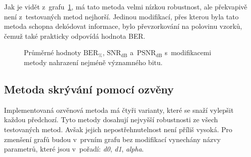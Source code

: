 Jak je vidět z~grafu~\ref{pic:modifications-mean-values-lsb}, má tato metoda
velmi nízkou robustnost, ale překvapivě není z~testovaných metod nejhorší.
Jedinou modifikací, přes kterou byla tato metoda schopna dekódovat informace,
bylo převzorkování na polovinu vzorků, čemuž také prakticky odpovídá hodnota
BER.

\begin{figure}[hbt]
    \table
    \centering
    \caption{Průměrné hodnoty $\mathrm{BER}_{\%}$, $\mathrm{SNR}_\mathrm{dB}$
    a~$\mathrm{PSNR}_\mathrm{dB}$ s~modifikacemi metody nahrazení nejméně
    významného bitu.}
    \label{pic:modifications-mean-values-lsb}
\end{figure}

\subsection*{Metoda skrývání pomocí ozvěny}

Implementovaná ozvěnová metoda má čtyři varianty, které se snaží vylepšit
každou předchozí. Tyto metody dosahují nejvyšší robustnosti ze všech
testovaných metod. Avšak jejich nepostřehnutelnost není příliš vysoká. Pro
zmenšení grafů budou v~prvním grafu bez modifikací vynechány názvy parametrů,
které jsou v~pořadí: \textit{d0}, \textit{d1}, \textit{alpha}.

